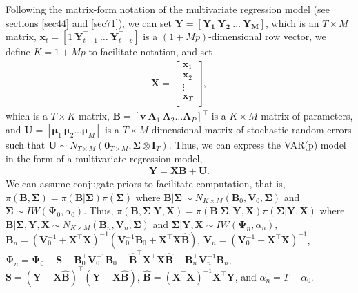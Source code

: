 Following the matrix-form notation of the multivariate regression model (see sections \ref{sec44} and \ref{sec71}), we can set $\bm{Y}=\left[{\bm{Y_{1}}} \ {\bm{Y_{2}}} \ \ldots \ {\bm{Y_{M}}}\right]$, which is an $ T\times M$ matrix, $\bm{x}_t=[1 \ \bm{Y}_{t-1}^{\top} \ \dots \ \bm{Y}_{t-p}^{\top}]$ is a $(1+Mp)$-dimensional row vector, we define $K=1+Mp$ to facilitate notation, and set \begin{align*}
\bm{X}=\begin{bmatrix}
	\bm{x}_1\\
	\bm{x}_2\\
	\vdots \\
	\bm{x}_T\\
\end{bmatrix},
\end{align*}
which is a $ T\times K$ matrix, $\bm{B}=\left[\bm{v} \ \bm{A}_{1} \ \bm{A}_{2} \ldots \bm{A}_{P}\right]^{\top}$ is a $ K \times M$ matrix of parameters, and $\bm{U}=\left[\bm{\mu}_{1} \ \bm{\mu}_{2}\ldots \bm{\mu}_{M}\right]$ is a $T\times M$-dimensional matrix of stochastic random errors such that $\bm{U}\sim N_{T\times M}(\bm{0}_{T\times M},\bm{\Sigma}\otimes \bm{I}_T)$. Thus, we can express the VAR(p) model in the form of a multivariate regression model,
\begin{align*}
	\bm{Y}=\bm{X}\bm{B}+\bm{U}.
\end{align*}
We can assume conjugate priors to facilitate computation, that is, $\pi({\bm{B}},{\bm{\Sigma}})=\pi({\bm{B}}|{\bm{\Sigma}})\pi({\bm{\Sigma}})$ where ${\bm{B}}|{\bm \Sigma}\sim N_{K\times M}({\bm{B}}_{0},{\bm{V}}_{0},{\bm{\Sigma}})$ and ${\bm{\Sigma}}\sim IW({\bm{\Psi}}_{0},\alpha_{0})$. Thus, $\pi({\bm{B}},{\bm \Sigma}| {\bm{Y}}, {\bm{X}})=\pi ({\bm{B}}| {\bm \Sigma},{\bm{Y}},{\bm{X}})\pi({\bm \Sigma}| {\bm{Y}},{\bm{X}})$ where ${\bm{B}}| {\bm \Sigma},{\bm{Y}}, {\bm{X}} \sim N_{K\times M}({\bm{B}}_n,{\bm{V}}_n,{\bm \Sigma})$ and ${\bm \Sigma}| {\bm{Y}},{\bm{X}} \sim IW({\bm{\Psi}}_n,{\alpha}_n)$, ${\bm{B}}_n = ({\bm{V}}_{0}^{-1}+{\bm{X}}^{\top}{\bm{X}})^{-1}({\bm{V}}_{0}^{-1}{\bm{B}}_{0}+{\bm{X}}^{\top}{\bm{X}}\widehat{\bm{B}})$, ${\bm{V}}_n = ({\bm{V}}_{0}^{-1}+{\bm{X}}^{\top}{\bm{X}})^{-1}$, ${\bm{\Psi}}_n={\bm{\Psi}}_{0}+{\bm{S}}+{\bm{B}}_{0}^{\top}{\bm{V}}_{0}^{-1}{\bm{B}}_{0}+\widehat{\bm{B}}^{\top}{\bm{X}}^{\top}{\bm{X}}\widehat{\bm{B}}-{\bm{B}}_n^{\top}{\bm{V}}_n^{-1}{\bm{B}}_n$, ${\bm{S}}= ({\bm{Y}}-{\bm{X}}\widehat{\bm{B}})^{\top}({\bm{Y}}-{\bm{X}}\widehat{\bm{B}})$, $\widehat{\bm{B}}= ({\bm{X}}^{\top}{\bm{X}})^{-1}{\bm{X}}^{\top}{\bm{Y}}$, and  $\alpha_n= T+\alpha_{0}$. 

